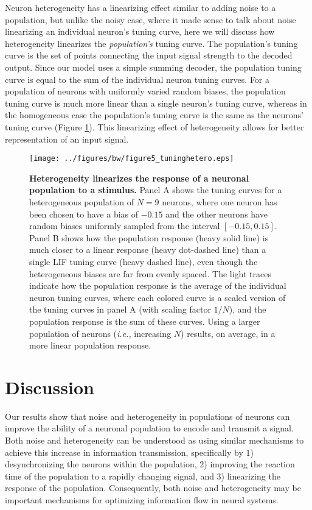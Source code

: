 \documentclass[12pt]{article}
\newcommand{\ie}{\emph{i.e., }}
\newcommand{\fig}[1]{Figure \ref{fig:#1}}
\newcommand{\figlabel}[1]{\label{fig:#1}}
\newcommand{\scnlabel}[1]{\label{scn:#1}}
\begin{document}
Neuron heterogeneity has a linearizing effect similar to adding noise to a population, but unlike the noisy case, where it made sense to talk about noise linearizing an individual neuron's tuning curve, here we will discuss how heterogeneity linearizes the \emph{population's} tuning curve. The population's tuning curve is the set of points connecting the input signal strength to the decoded output. Since our model uses a simple summing decoder, the population tuning curve is equal to the sum of the individual neuron tuning curves. For a population of neurons with uniformly varied random biases, the population tuning curve is much more linear than a single neuron's tuning curve, whereas in the homogeneous case the population's tuning curve is the same as the neurons' tuning curve (\fig{tuninghetero}). This linearizing effect of heterogeneity allows for better representation of an input signal.

\begin{figure}
  \ifx\hidefigures\undefined
    \centering
    \texttt{[image: ../figures/bw/figure5\_tuninghetero.eps]}
  \fi
  \caption{
    \textbf{Heterogeneity linearizes the response of a neuronal population to a stimulus.} Panel A shows the tuning curves for a heterogeneous population of $N = 9$ neurons, where one neuron has been chosen to have a bias of $-0.15$ and the other neurons have random biases uniformly sampled from the interval $[-0.15,0.15]$. Panel B shows how the population response (heavy solid line) is much closer to a linear response (heavy dot-dashed line) than a single LIF tuning curve (heavy dashed line), even though the heterogeneous biases are far from evenly spaced. The light traces indicate how the population response is the average of the individual neuron tuning curves, where each colored curve is a scaled version of the tuning curves in panel A (with scaling factor $1/N$), and the population response is the sum of these curves. Using a larger population of neurons (\ie increasing $N$) results, on average, in a more linear population response.
  }
  \figlabel{tuninghetero}
\end{figure}

\section{Discussion}
\scnlabel{discussion}

Our results show that noise and heterogeneity in populations of neurons can improve the ability of a neuronal population to encode and transmit a signal. Both noise and heterogeneity can be understood as using similar mechanisms to achieve this increase in information transmission, specifically by 1) desynchronizing the neurons within the population, 2) improving the reaction time of the population to a rapidly changing signal, and 3) linearizing the response of the population. Consequently, both noise and heterogeneity may be important mechanisms for optimizing information flow in neural systems.
\end{document}
